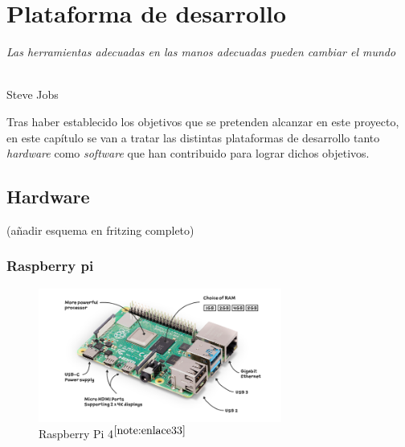 \chapter{Plataforma de desarrollo}
\label{cap:capitulo3}

\begin{flushright}
\begin{minipage}[]{10cm}
\emph{Las herramientas adecuadas en las manos adecuadas pueden cambiar el mundo}\\
\end{minipage}\\

Steve Jobs\\
\end{flushright}

\vspace{1cm}

Tras haber establecido los objetivos que se pretenden alcanzar en este proyecto, en este capítulo se van a tratar las distintas plataformas de desarrollo tanto \textit{hardware} como \textit{software} que han contribuido para lograr dichos objetivos.

\section{Hardware}

(añadir esquema en fritzing completo)

\subsection{Raspberry pi}


\begin{figure} [h!]
	\begin{center}
		\includegraphics[width=8cm]{figs/raspberrypi4.png}
	\end{center}
	\caption{Raspberry Pi 4$^{\ref{note:enlace33}}$} 
\label{fig:raspberry}
\end{figure}\

\setcounter{footnote}{33} %


